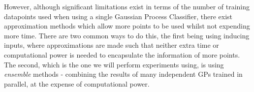 However, although significant limitations exist in terms of the number of training datapoints used when using a single Gaussian Process Classifier, there exist approximation methods which allow more points to be used whilst not expending more time. There are two common ways to do this, the first being using inducing inputs, where approximations are made such that neither extra time or computational power is needed to encapsulate the information of more points. The second, which is the one we will perform experiments using, is using \textit{ensemble} methods - combining the results of many independent GPs trained in parallel, at the expense of computational power.

\citep{deisenroth15}

